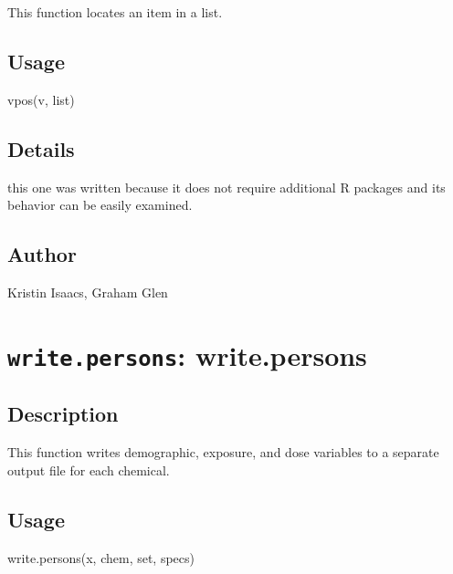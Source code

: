 \documentclass[
]{article}
\newenvironment{Shaded}{\begin{snugshade}}{\end{snugshade}}
\newcommand{\FunctionTok}[1]{\textcolor[rgb]{0.00,0.00,0.00}{#1}}
\newcommand{\NormalTok}[1]{#1}
\begin{document}
This function locates an item in a list.

\hypertarget{usage-57}{%
\subsection{Usage}\label{usage-57}}

\begin{Shaded}
\begin{Highlighting}[]
\FunctionTok{vpos}\NormalTok{(v, list)}
\end{Highlighting}
\end{Shaded}

\hypertarget{details-33}{%
\subsection{Details}\label{details-33}}

this one was written because it does not require additional R packages
and its behavior can be easily examined.

\hypertarget{author-36}{%
\subsection{Author}\label{author-36}}

Kristin Isaacs, Graham Glen

\hypertarget{write.persons-write.persons}{%
\section{\texorpdfstring{\texttt{write.persons}:
write.persons}{write.persons: write.persons}}\label{write.persons-write.persons}}

\hypertarget{description-58}{%
\subsection{Description}\label{description-58}}

This function writes demographic, exposure, and dose variables to a
separate output file for each chemical.

\hypertarget{usage-58}{%
\subsection{Usage}\label{usage-58}}

\begin{Shaded}
\begin{Highlighting}[]
\FunctionTok{write.persons}\NormalTok{(x, chem, set, specs)}
\end{Highlighting}
\end{Shaded}
\end{document}
